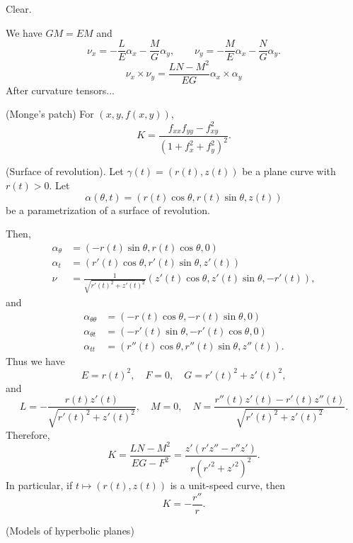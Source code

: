 \documentclass{../note}
\def\a{\alpha}
\begin{document}
\begin{prb}
\begin{pf}$ $\\[-12pt]
\begin{parts}
\item Clear.
\item
We have $GM=EM$ and
\[\nu_x=-\frac LE\a_x-\frac MG\a_y,\qquad\nu_y=-\frac ME\a_x-\frac NG\a_y.\]
\[\nu_x\times\nu_y=\frac{LN-M^2}{EG}\a_x\times\a_y\]
After curvature tensors...
\end{parts}
\end{pf}



\begin{ex}
\begin{parts}
\item
(Monge's patch)
For $(x,y,f(x,y))$,
\[K=\frac{f_{xx}f_{yy}-f_{xy}^2}{(1+f_x^2+f_y^2)^2}.\]
\item
(Surface of revolution).
Let $\gamma(t)=(r(t),z(t))$ be a plane curve with $r(t)>0$.
Let
\[\a(\theta,t)=(r(t)\cos\theta,r(t)\sin\theta,z(t))\]
be a parametrization of a surface of revolution.

Then,
\begin{align*}
\a_\theta&=(-r(t)\sin\theta,r(t)\cos\theta,0)\\
\a_t&=(r'(t)\cos\theta,r'(t)\sin\theta,z'(t))\\
\nu&=\frac1{\sqrt{r'(t)^2+z'(t)^2}}(z'(t)\cos\theta,z'(t)\sin\theta,-r'(t)),
\end{align*}
and
\begin{align*}
\a_{\theta\theta}&=(-r(t)\cos\theta,-r(t)\sin\theta,0)\\
\a_{\theta t}&=(-r'(t)\sin\theta,-r'(t)\cos\theta,0)\\
\a_{tt}&=(r''(t)\cos\theta,r''(t)\sin\theta,z''(t)).
\end{align*}
Thus we have
\[E=r(t)^2,\quad F=0,\quad G=r'(t)^2+z'(t)^2,\]
and
\[L=-\frac{r(t)z'(t)}{\sqrt{r'(t)^2+z'(t)^2}},\quad M=0,\quad N=\frac{r''(t)z'(t)-r'(t)z''(t)}{\sqrt{r'(t)^2+z'(t)^2}}.\]
Therefore,
\[K=\frac{LN-M^2}{EG-F^2}=\frac{z'(r'z''-r''z')}{r(r'^2+z'^2)^2}.\]
In particular, if $t\mapsto(r(t),z(t))$ is a unit-speed curve, then
\[K=-\frac{r''}r.\]

\item
(Models of hyperbolic planes)
\end{parts}
\end{ex}





\end{prb}
\end{document}
